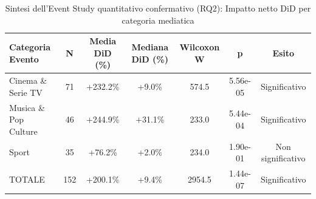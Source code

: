 \begin{table}[t]
\centering
\footnotesize
\caption{Sintesi dell'Event Study quantitativo confermativo (RQ2): Impatto netto DiD per categoria mediatica}
\label{tab:event_study_summary}
\begin{tabular}{>{\raggedright\arraybackslash}p{4cm} c c c c c c}
\toprule
\textbf{Categoria Evento} & \textbf{N} & \textbf{Media DiD (\%)} & \textbf{Mediana DiD (\%)} & \textbf{Wilcoxon W} & \textbf{p} & \textbf{Esito} \\
\midrule
Cinema \& Serie TV & 71 & +232.2\% & +9.0\% & 574.5 & 5.56e-05 & Significativo \\
Musica \& Pop Culture & 46 & +244.9\% & +31.1\% & 233.0 & 5.44e-04 & Significativo \\
Sport & 35 & +76.2\% & +2.0\% & 234.0 & 1.90e-01 & Non significativo \\
TOTALE & 152 & +200.1\% & +9.4\% & 2954.5 & 1.44e-07 & Significativo \\
\bottomrule
\end{tabular}
\end{table}
